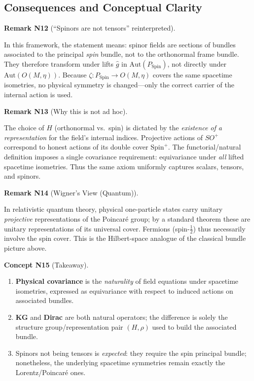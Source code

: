 \documentclass[10pt, letterpaper]{article}
\newcommand{\Aut}{\mathrm{Aut}}
\newcommand{\Spin}{\mathrm{Spin}}
\newcommand{\CustomHeading}[3]{%
  \par\medskip\noindent%
  \textbf{#1 #2} \textnormal{(#3)}.\enskip%
}
\newenvironment{REM}[2]{\begin{unitbox}\CustomHeading{Remark}{#1}{#2}}{\end{unitbox}}
\newenvironment{CONC}[2]{\begin{unitbox}\CustomHeading{Concept}{#1}{#2}}{\end{unitbox}}
\begin{document}
\subsection{Consequences and Conceptual Clarity}

\begin{REM}{N12}{``Spinors are not tensors'' reinterpreted}
In this framework, the statement means: spinor fields are sections of bundles associated to the principal \emph{spin} bundle, not to the orthonormal frame bundle.  
They therefore transform under lifts $\widehat g$ in $\Aut(P_{\Spin})$, not directly under $\Aut(O(M,\eta))$.  
Because $\zeta:P_{\Spin}\to O(M,\eta)$ covers the same spacetime isometries, no physical symmetry is changed—only the correct carrier of the internal action is used.
\end{REM}

\begin{REM}{N13}{Why this is not ad hoc}
The choice of $H$ (orthonormal vs.\ spin) is dictated by the \emph{existence of a representation} for the field’s internal indices.  
Projective actions of $SO^+$ correspond to honest actions of its double cover $\Spin^+$.  
The functorial/natural definition imposes a single covariance requirement: equivariance under \emph{all} lifted spacetime isometries.  
Thus the same axiom uniformly captures scalars, tensors, and spinors.
\end{REM}

\begin{REM}{N14}{Wigner’s View (Quantum)}
In relativistic quantum theory, physical one-particle states carry unitary \emph{projective} representations of the Poincaré group; by a standard theorem these are unitary representations of its universal cover.  
Fermions (spin-$\tfrac12$) thus necessarily involve the spin cover.  
This is the Hilbert-space analogue of the classical bundle picture above.
\end{REM}

\begin{CONC}{N15}{Takeaway}
\begin{enumerate}[label=\roman*)]
\item \textbf{Physical covariance} is the \emph{naturality} of field equations under spacetime isometries, expressed as equivariance with respect to induced actions on associated bundles.
\item \textbf{KG} and \textbf{Dirac} are both natural operators; the difference is solely the structure group/representation pair $(H,\rho)$ used to build the associated bundle.
\item Spinors not being tensors is \emph{expected}: they require the spin principal bundle; nonetheless, the underlying spacetime symmetries remain exactly the Lorentz/Poincaré ones.
\end{enumerate}
\end{CONC}
\end{document}
